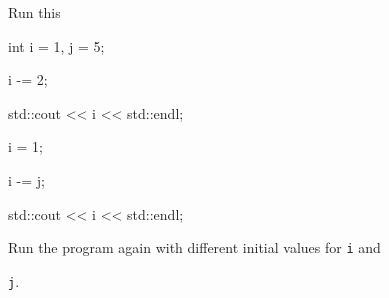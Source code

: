Run this

\begin{console}

int i = 1, j = 5;



i -= 2;

std::cout << i << std::endl;



i = 1;

i -= j;

std::cout << i << std::endl;

\end{console}

Run the program again with different initial values for \texttt{i} and

\texttt{j}.

